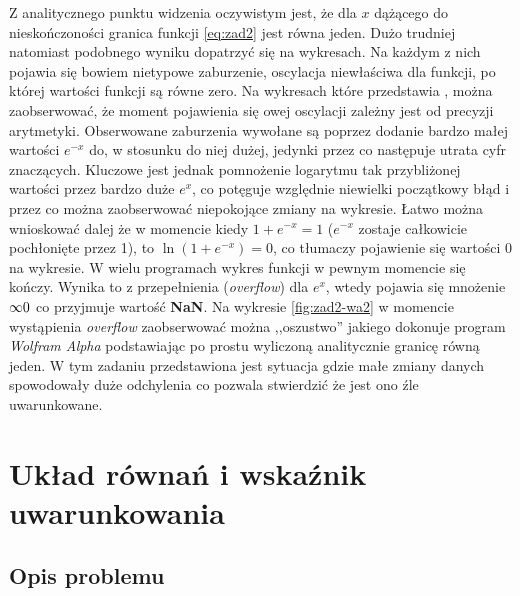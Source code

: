 \documentclass[11pt]{mk-polish-lab-report}
\let\times\relax%
\DeclareMathOperator{\times}{\cdot}
\begin{document}
Z analitycznego punktu widzenia oczywistym jest, że dla $x$ dążącego do nieskończoności granica funkcji \eqref{eq:zad2} jest równa jeden. Dużo trudniej natomiast podobnego wyniku dopatrzyć się na wykresach. Na każdym z nich pojawia się bowiem nietypowe zaburzenie, oscylacja niewłaściwa dla funkcji, po której wartości funkcji są równe zero. Na wykresach które przedstawia , można zaobserwować, że moment pojawienia się owej oscylacji zależny jest od precyzji arytmetyki. Obserwowane zaburzenia wywołane są poprzez dodanie bardzo małej wartości $e^{-x}$ do, w stosunku do niej dużej, jedynki przez co następuje utrata cyfr znaczących. Kluczowe jest jednak pomnożenie logarytmu tak przybliżonej wartości przez bardzo duże $e^{x}$, co potęguje względnie niewielki początkowy błąd i przez co można zaobserwować niepokojące zmiany na wykresie. Łatwo można wnioskować dalej że w momencie kiedy $1 + e^{-x} = 1$ ($e^{-x}$ zostaje całkowicie pochłonięte przez 1), to $\ln(1 + e^{-x}) = 0$, co tłumaczy pojawienie się wartości $0$ na wykresie. W wielu programach wykres funkcji w pewnym momencie się kończy. Wynika to z przepełnienia (\emph{overflow}) dla $e^x$, wtedy pojawia się mnożenie $\infty \times 0$ co przyjmuje wartość \textbf{NaN}. Na wykresie \ref{fig:zad2-wa2} w momencie wystąpienia \emph{overflow} zaobserwować można ,,oszustwo'' jakiego dokonuje program \emph{Wolfram Alpha} podstawiając po prostu wyliczoną analitycznie granicę równą jeden. W tym zadaniu przedstawiona jest sytuacja gdzie małe zmiany danych spowodowały duże odchylenia co pozwala stwierdzić że jest ono źle uwarunkowane.

\section{Układ równań i wskaźnik uwarunkowania}

\subsection{Opis problemu}
\end{document}
